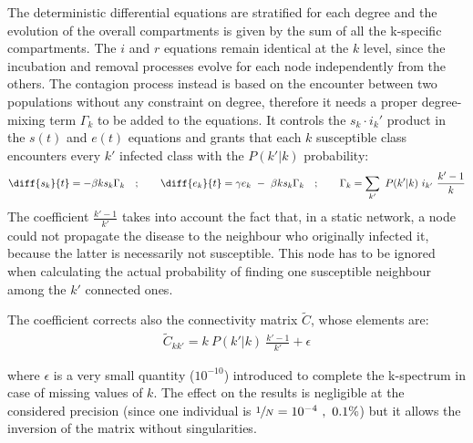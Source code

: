 \documentclass[DIV=12, BCOR=0pt]{scrartcl}  %
\begin{document}
  The deterministic differential equations are stratified for each degree and the evolution of the overall compartments is given by the sum of all the k-specific compartments. The $i$ and $r$ equations remain identical at the $k$ level, since the incubation and removal processes evolve for each node independently from the others. The contagion process instead is based on the encounter between two populations without any constraint on degree, therefore it needs a proper degree-mixing term $\Gamma_k$ to be added to the equations. It controls the $s_k \cdot i_k'$ product in the $s(t)$ and $e(t)$ equations and grants that each $k$ susceptible class encounters every $k'$ infected class with the $P(k'|k)$ probability:
  \begin{align}
  	\diff{s_{k}}{t} = - \beta k s_{k} \Gamma_{k} \quad;  \qquad 	\diff{e_{k}}{t} =  \gamma e_{k} \ - \ \beta k s_{k} \Gamma_{k} \quad; \qquad	\Gamma_{k} = \sum_{k'} \ P(k'|k) \ i_{k'}  \ \frac{k' - 1}{k}
  	\label{eq:seir_dbmf}
  \end{align}
%  
  The coefficient $\frac{k' - 1}{k'}$ takes into account the fact that, in a static network, a node could not propagate the disease to the neighbour who originally infected it, because the latter is necessarily not susceptible. This node has to be ignored when calculating the actual probability of finding one susceptible neighbour among the $k'$ connected ones.
  
  The coefficient corrects also the connectivity matrix $\tilde{C}$, whose elements are:  
  \begin{align}
		\tilde{C}_{kk'} = k \ P(k'|k) \ \frac{k' - 1}{k'} + \epsilon
  \end{align}

	where $\epsilon$ is a very small quantity ($10^{-10}$) introduced to complete the k-spectrum in case of missing values of $k$. The effect on the results is negligible at the considered precision (since one individual is $ \sfrac{1}{N} = 10^{-4} \ , \ 0.1 \%$) but it allows the inversion of the matrix without singularities.
\end{document}
